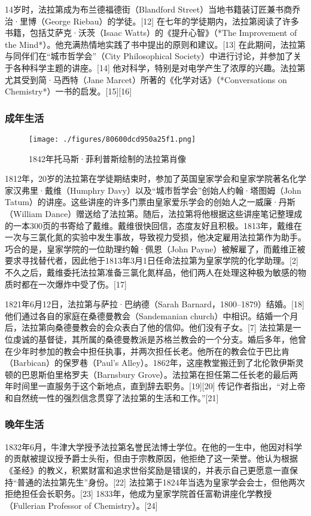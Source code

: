 14岁时，法拉第成为布兰德福德街（Blandford Street）当地书籍装订匠兼书商乔治·里博（George Riebau）的学徒。[12] 在七年的学徒期内，法拉第阅读了许多书籍，包括艾萨克·沃茨（Isaac Watts）的《提升心智》（*The Improvement of the Mind*）。他充满热情地实践了书中提出的原则和建议。[13] 在此期间，法拉第与同伴们在“城市哲学会”（City Philosophical Society）中进行讨论，并参加了关于各种科学主题的讲座。[14] 他对科学，特别是对电学产生了浓厚的兴趣。法拉第尤其受到简·马西特（Jane Marcet）所著的《化学对话》（*Conversations on Chemistry*）一书的启发。[15][16]
\subsubsection{成年生活}
\begin{figure}[ht]
\centering
\texttt{[image: ./figures/80600dcd950a25f1.png]}
\caption{1842年托马斯·菲利普斯绘制的法拉第肖像} \label{fig_FLD_1}
\end{figure}
1812年，20岁的法拉第在学徒期结束时，参加了英国皇家学会和皇家学院著名化学家汉弗里·戴维（Humphry Davy）以及“城市哲学会”创始人约翰·塔图姆（John Tatum）的讲座。这些讲座的许多门票由皇家爱乐学会的创始人之一威廉·丹斯（William Dance）赠送给了法拉第。随后，法拉第将他根据这些讲座笔记整理成的一本300页的书寄给了戴维。戴维很快回信，态度友好且积极。1813年，戴维在一次与三氯化氮的实验中发生事故，导致视力受损，他决定雇用法拉第作为助手。巧合的是，皇家学院的一位助理约翰·佩恩（John Payne）被解雇了，而戴维正被要求寻找替代者，因此他于1813年3月1日任命法拉第为皇家学院的化学助理。[2] 不久之后，戴维委托法拉第准备三氯化氮样品，他们两人在处理这种极为敏感的物质时都在一次爆炸中受了伤。[17]

1821年6月12日，法拉第与萨拉·巴纳德（Sarah Barnard，1800–1879）结婚。[18] 他们通过各自的家庭在桑德曼教会（Sandemanian church）中相识。结婚一个月后，法拉第向桑德曼教会的会众表白了他的信仰。他们没有子女。[7] 法拉第是一位虔诚的基督徒，其所属的桑德曼教派是苏格兰教会的一个分支。婚后多年，他曾在少年时参加的教会中担任执事，并两次担任长老。他所在的教会位于巴比肯（Barbican）的保罗巷（Paul's Alley）。1862年，这座教堂搬迁到了北伦敦伊斯灵顿的巴恩斯伯里格罗夫（Barnsbury Grove）。法拉第在担任第二任长老的最后两年时间里一直服务于这个新地点，直到辞去职务。[19][20] 传记作者指出，“对上帝和自然统一性的强烈信念贯穿了法拉第的生活和工作。”[21]
\subsubsection{晚年生活}
1832年6月，牛津大学授予法拉第名誉民法博士学位。在他的一生中，他因对科学的贡献被提议授予爵士头衔，但由于宗教原因，他拒绝了这一荣誉。他认为根据《圣经》的教义，积累财富和追求世俗奖励是错误的，并表示自己更愿意一直保持“普通的法拉第先生”身份。[22] 法拉第于1824年当选为皇家学会会士，但他两次拒绝担任会长职务。[23] 1833年，他成为皇家学院首任富勒讲座化学教授（Fullerian Professor of Chemistry）。[24]  


